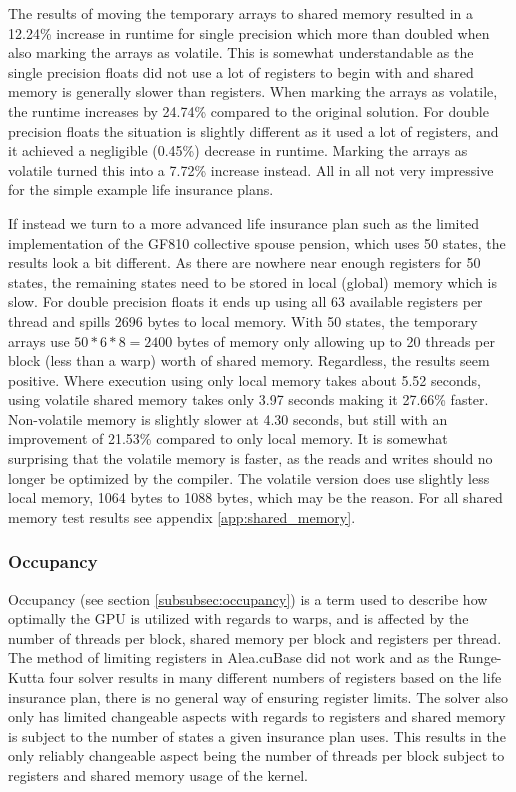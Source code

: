 The results of moving the temporary arrays to shared memory resulted in a 12.24\% increase in runtime for single precision which more than doubled when also marking the arrays as volatile.
This is somewhat understandable as the single precision floats did not use a lot of registers to begin with and shared memory is generally slower than registers.
When marking the arrays as volatile, the runtime increases by 24.74\% compared to the original solution.
For double precision floats the situation is slightly different as it used a lot of registers, and it achieved a negligible (0.45\%) decrease in runtime.
Marking the arrays as volatile turned this into a 7.72\% increase instead.
All in all not very impressive for the simple example life insurance plans.

If instead we turn to a more advanced life insurance plan such as the limited implementation of the GF810 collective spouse pension, which uses 50 states, the results look a bit different.
As there are nowhere near enough registers for 50 states, the remaining states need to be stored in local (global) memory which is slow.
For double precision floats it ends up using all 63 available registers per thread and spills 2696 bytes to local memory.
With 50 states, the temporary arrays use $50*6*8=2400$ bytes of memory only allowing up to 20 threads per block (less than a warp) worth of shared memory. 
Regardless, the results seem positive.
Where execution using only local memory takes about 5.52 seconds, using volatile shared memory takes only 3.97 seconds making it 27.66\% faster.
Non-volatile memory is slightly slower at 4.30 seconds, but still with an improvement of 21.53\% compared to only local memory.
It is somewhat surprising that the volatile memory is faster, as the reads and writes should no longer be optimized by the compiler.
The volatile version does use slightly less local memory, 1064 bytes to 1088 bytes, which may be the reason.
For all shared memory test results see appendix \ref{app:shared_memory}.

\subsubsection{Occupancy}\label{subsubsec:test:occupancy}
Occupancy (see section \ref{subsubsec:occupancy}) is a term used to describe how optimally the GPU is utilized with regards to warps, and is affected by the number of threads per block, shared memory per block and registers per thread.
The method of limiting registers in Alea.cuBase did not work and as the Runge-Kutta four solver results in many different numbers of registers based on the life insurance plan, there is no general way of ensuring register limits.
The solver also only has limited changeable aspects with regards to registers and shared memory is subject to the number of states a given insurance plan uses.
This results in the only reliably changeable aspect being the number of threads per block subject to registers and shared memory usage of the kernel.

